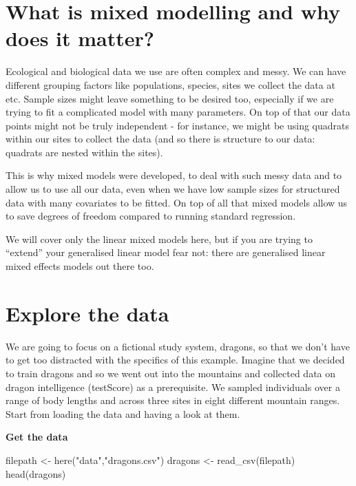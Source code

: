 \documentclass[
  letterpaper,
  DIV=11,
  numbers=noendperiod]{scrreprt}
\newenvironment{Shaded}{\begin{snugshade}}{\end{snugshade}}
\newcommand{\FunctionTok}[1]{\textcolor[rgb]{0.28,0.35,0.67}{#1}}
\newcommand{\NormalTok}[1]{\textcolor[rgb]{0.00,0.23,0.31}{#1}}
\newcommand{\OtherTok}[1]{\textcolor[rgb]{0.00,0.23,0.31}{#1}}
\newcommand{\StringTok}[1]{\textcolor[rgb]{0.13,0.47,0.30}{#1}}
\begin{document}
\section{What is mixed modelling and why does it
matter?}\label{what-is-mixed-modelling-and-why-does-it-matter}

Ecological and biological data we use are often complex and messy. We
can have different grouping factors like populations, species, sites we
collect the data at etc. Sample sizes might leave something to be
desired too, especially if we are trying to fit a complicated model with
many parameters. On top of that our data points might not be truly
independent - for instance, we might be using quadrats within our sites
to collect the data (and so there is structure to our data: quadrats are
nested within the sites).

This is why mixed models were developed, to deal with such messy data
and to allow us to use all our data, even when we have low sample sizes
for structured data with many covariates to be fitted. On top of all
that mixed models allow us to save degrees of freedom compared to
running standard regression.

We will cover only the linear mixed models here, but if you are trying
to ``extend'' your generalised linear model fear not: there are
generalised linear mixed effects models out there too.

\section{Explore the data}\label{explore-the-data}

We are going to focus on a fictional study system, dragons, so that we
don't have to get too distracted with the specifics of this example.
Imagine that we decided to train dragons and so we went out into the
mountains and collected data on dragon intelligence (testScore) as a
prerequisite. We sampled individuals over a range of body lengths and
across three sites in eight different mountain ranges. Start from
loading the data and having a look at them.

\textbf{Get the data}

\begin{Shaded}
\begin{Highlighting}[]
\NormalTok{filepath }\OtherTok{\textless{}{-}} \FunctionTok{here}\NormalTok{(}\StringTok{"data"}\NormalTok{,}\StringTok{"dragons.csv"}\NormalTok{)}
\NormalTok{dragons }\OtherTok{\textless{}{-}} \FunctionTok{read\_csv}\NormalTok{(filepath)}
\FunctionTok{head}\NormalTok{(dragons)}
\end{Highlighting}
\end{Shaded}
\end{document}
